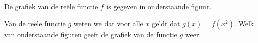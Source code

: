 \newpage
\begin{oefening2}

De grafiek van de re\"ele functie $f$ is gegeven in onderstaande figuur.

Van de re\"ele functie $g$ weten we dat voor alle $x$ geldt dat $g(x)=f(x^2)$. Welk van onderstaande figuren geeft de grafiek van de functie $g$ weer.

\end{oefening2}
